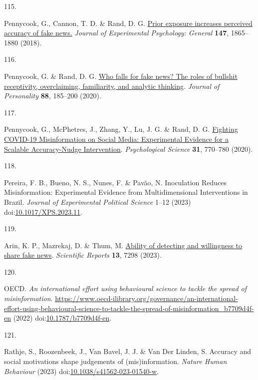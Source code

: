 \documentclass[
  man]{apa6}
\newlength{\cslhangindent}
\newlength{\csllabelwidth}
\newenvironment{CSLReferences}[2] %
 {\begin{list}{}{%
  \setlength{\itemindent}{0pt}
  \setlength{\leftmargin}{0pt}
  \setlength{\parsep}{0pt}
  \ifodd #1
   \setlength{\leftmargin}{\cslhangindent}
   \setlength{\itemindent}{-1\cslhangindent}
  \fi
  \setlength{\itemsep}{#2\baselineskip}}}
 {\end{list}}
\newcommand{\CSLLeftMargin}[1]{\parbox[t]{\csllabelwidth}{\strut#1\strut}}
\newcommand{\CSLRightInline}[1]{\parbox[t]{\linewidth - \csllabelwidth}{\strut#1\strut}}
\begin{document}
\begin{CSLReferences}{0}{0}
\CSLLeftMargin{115. }%
\CSLRightInline{*Pennycook, G., Cannon, T. D. \& Rand, D. G. \href{https://doi.org/10.1037/xge0000465}{Prior exposure increases perceived accuracy of fake news.} \emph{Journal of Experimental Psychology: General} \textbf{147}, 1865--1880 (2018).}

\CSLLeftMargin{116. }%
\CSLRightInline{*Pennycook, G. \& Rand, D. G. \href{https://doi.org/10.1111/jopy.12476}{Who falls for fake news? The roles of bullshit receptivity, overclaiming, familiarity, and analytic thinking}. \emph{Journal of Personality} \textbf{88}, 185--200 (2020).}

\CSLLeftMargin{117. }%
\CSLRightInline{*Pennycook, G., McPhetres, J., Zhang, Y., Lu, J. G. \& Rand, D. G. \href{https://doi.org/10.1177/0956797620939054}{Fighting COVID-19 Misinformation on Social Media: Experimental Evidence for a Scalable Accuracy-Nudge Intervention}. \emph{Psychological Science} \textbf{31}, 770--780 (2020).}

\CSLLeftMargin{118. }%
\CSLRightInline{*Pereira, F. B., Bueno, N. S., Nunes, F. \& Pavão, N. Inoculation Reduces Misinformation: Experimental Evidence from Multidimensional Interventions in Brazil. \emph{Journal of Experimental Political Science} 1--12 (2023) doi:\href{https://doi.org/10.1017/XPS.2023.11}{10.1017/XPS.2023.11}.}

\CSLLeftMargin{119. }%
\CSLRightInline{*Arin, K. P., Mazrekaj, D. \& Thum, M. \href{https://doi.org/10.1038/s41598-023-34402-6}{Ability of detecting and willingness to share fake news}. \emph{Scientific Reports} \textbf{13}, 7298 (2023).}

\CSLLeftMargin{120. }%
\CSLRightInline{*OECD. \emph{An international effort using behavioural science to tackle the spread of misinformation}. \url{https://www.oecd-ilibrary.org/governance/an-international-effort-using-behavioural-science-to-tackle-the-spread-of-misinformation_b7709d4f-en} (2022) doi:\href{https://doi.org/10.1787/b7709d4f-en}{10.1787/b7709d4f-en}.}

\CSLLeftMargin{121. }%
\CSLRightInline{*Rathje, S., Roozenbeek, J., Van Bavel, J. J. \& Van Der Linden, S. Accuracy and social motivations shape judgements of (mis)information. \emph{Nature Human Behaviour} (2023) doi:\href{https://doi.org/10.1038/s41562-023-01540-w}{10.1038/s41562-023-01540-w}.}


\end{CSLReferences}
\end{document}
